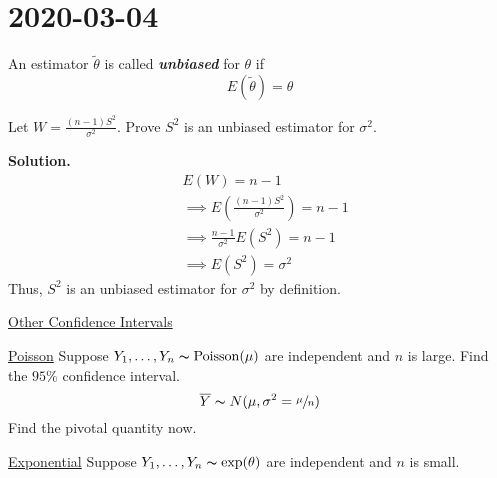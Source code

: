 \section{2020-03-04}
\begin{defbox}
    \begin{definition}
        An estimator $ \tilde{\theta} $ is called \textbf{\emph{unbiased}} for $ \theta $ if
        \[ E(\tilde{\theta})=\theta \]
    \end{definition}
\end{defbox}
\begin{exbox}
    \begin{example}
        Let $ W=\frac{(n-1)S^2}{\sigma^2} $. Prove $ S^2 $ is an unbiased
        estimator for $ \sigma^2 $.

        \textbf{Solution.}
        \begin{align*}
             & E(W)=n-1                                              \\
             & \implies E\left(\frac{(n-1)S^2}{\sigma^2} \right)=n-1 \\
             & \implies \frac{n-1}{\sigma^2} E(S^2)=n-1              \\
             & \implies E(S^2)=\sigma^2
        \end{align*}
        Thus, $ S^2 $ is an unbiased estimator for $ \sigma^2 $ by definition.
    \end{example}
\end{exbox}

\underline{Other Confidence Intervals}

\underline{Poisson}
Suppose $ Y_1,\ldots ,Y_n \thicksim \operatorname{Poisson}(\mu) $
are independent and $ n $ is large. Find the $ 95\% $ confidence interval.
\[ \overline{Y} \thicksim N(\mu,\sigma^2=\sfrac{\mu}{n}) \]
Find the pivotal quantity now.

\underline{Exponential}
Suppose $ Y_1,\ldots ,Y_n \thicksim \exp(\theta) $ are independent and $ n $ is small.

